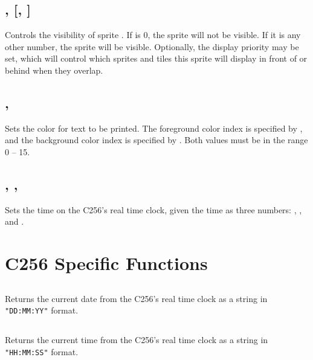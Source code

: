 \documentclass{report}
\begin{document}
    \subsection*{ ,  [,  ]}

    Controls the visibility of sprite .
    If  is 0, the sprite will not be visible.
    If it is any other number, the sprite will be visible.
    Optionally, the display priority  may be set, which will control
    which sprites and tiles this sprite will display in front of or behind when
    they overlap.

    \subsection*{ , }

    Sets the color for text to be printed.
    The foreground color index is specified by ,
    and the background color index is specified by .
    Both values must be in the range 0 -- 15.

    \subsection*{ , , }

    Sets the time on the C256's real time clock, given the time as three numbers:
    , , and .

    \section*{C256 Specific Functions}

    \subsection*{}

    Returns the current date from the C256's real time clock as a string
    in \verb+"DD:MM:YY"+ format.

    \subsection*{}

    Returns the current time from the C256's real time clock as a string
    in \verb+"HH:MM:SS"+ format.   
    
\end{document}
